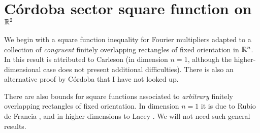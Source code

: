 \section{C\'ordoba sector square function on $\mathbb{R}^{2}$}

We begin with a square function inequality for Fourier multipliers adapted to a collection of \emph{congruent} finitely overlapping rectangles of fixed orientation in $\mathbb{R}^{n}$.
In \cite{MR850681} this result is attributed to Carleson (in dimension $n=1$, although the higher-dimensional case does not present additional difficulties).
There is also an alternative proof by C\'ordoba \cite{MR639467} that I have not looked up.

There are also bounds for square functions associated to \emph{arbitrary} finitely overlapping rectangles of fixed orientation.
In dimension $n=1$ it is due to Rubio de Francia \cite{MR850681}, and in higher dimensions to Lacey \cite{MR2293255}.
We will not need such general results.

